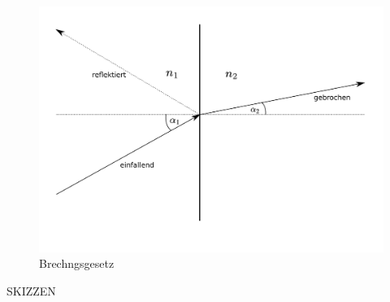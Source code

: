     \begin{figure}
        \centering
        \includegraphics{Geometrische_Optik/Protokoll/fig/Brechungsgesetz.svg.png}
        \caption{Brechngsgesetz}
        \label{fig:Brechungsgesetz}
    \end{figure}
    SKIZZEN